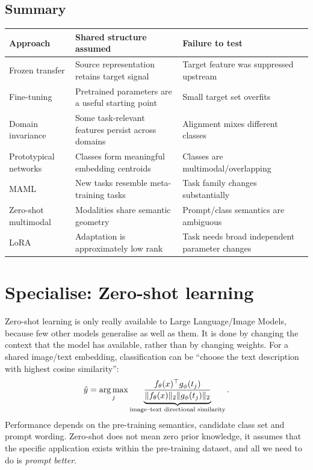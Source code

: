 \subsection{Summary}
\begin{calloutbias}
    \begin{tabularx}{\linewidth}{@{}L{.23\linewidth}YY@{}}
        \toprule
        Approach & Shared structure assumed & Failure to test \\
        \midrule
        Frozen transfer & Source representation retains target signal & Target feature was suppressed upstream \\
        Fine-tuning & Pretrained parameters are a useful starting point & Small target set overfits \\
        Domain invariance & Some task-relevant features persist across domains & Alignment mixes different classes \\
        Prototypical networks & Classes form meaningful embedding centroids & Classes are multimodal/overlapping \\
        MAML & New tasks resemble meta-training tasks & Task family changes substantially \\
        Zero-shot multimodal & Modalities share semantic geometry & Prompt/class semantics are ambiguous \\
        LoRA & Adaptation is approximately low rank & Task needs broad independent parameter changes \\
        \bottomrule
    \end{tabularx}
\end{calloutbias}

\section{Specialise: Zero-shot learning}
\label{sec:adaptation-zero-shot-learning-no-task-specific-labelled-examples}
Zero-shot learning is only really available to Large Language/Image Models, because few other models generalise as well as them.
It is done by changing the context that the model has available, rather than by changing weights.
For a shared image/text embedding, classification can be ``choose the text description with highest cosine similarity'':
\[
    \hat y
    =
    \operatorname*{arg\,max}_j
    \underbrace{
    \frac{f_\theta(x)^\top g_\phi(t_j)}{\|f_\theta(x)\|_2\|g_\phi(t_j)\|_2}
    }_{\text{image--text directional similarity}}.
\]
Performance depends on the pre-training semantics, candidate class set and prompt wording.
Zero-shot does not mean zero prior knowledge, it assumes that the specific application exists within the pre-training dataset, and all we need to do is \textit{prompt better}.

